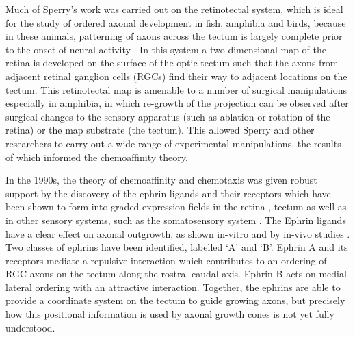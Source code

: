 \documentclass[11pt, a4paper]{article}
\begin{document}
Much of Sperry's work was carried out on the retinotectal system, which is ideal for the study of ordered axonal development in fish, amphibia and birds, because in these animals, patterning of axons across the tectum is largely complete prior to the onset of neural activity \citep{oleary_molecular_1999}.
In this system a two-dimensional map of  the retina is developed on the surface of the optic tectum such that the axons from adjacent retinal ganglion cells (RGCs) find their way to adjacent locations on the tectum. 
This retinotectal map is amenable to a number of surgical manipulations especially in amphibia, in which re-growth of the projection can be observed after surgical changes to the sensory apparatus (such as ablation or rotation of the retina) or the map substrate (the tectum).
This allowed Sperry and other researchers to carry out a wide range of experimental manipulations, the results of which informed the chemoaffinity theory. 

In the 1990s, the theory of chemoaffinity and chemotaxis was given robust support by the discovery of the ephrin ligands and their receptors \citep{cheng_complementary_1995,drescher_vitro_1995} which have been shown to form into graded expression fields in the retina \citep{braisted_graded_1997}, tectum \citep{braisted_graded_1997,feldheim_genetic_2000} as well as in other sensory systems, such as the somatosensory system \citep{vanderhaeghen_mapping_2000}. %
%
The Ephrin ligands have a clear effect on axonal outgrowth, as shown in-vitro \citep{cheng_complementary_1995,drescher_vitro_1995,hansen_retinal_2004} and by in-vivo studies \citep{frisen_ephrin-a5_1998,rodger_transient_2000,mann_topographic_2002,hindges_ephb_2002}.
Two classes of ephrins have been identified, labelled `A' and `B'.
Ephrin A and its receptors mediate a repulsive interaction which contributes to an ordering of RGC axons on the tectum along the rostral-caudal axis. Ephrin B acts on medial-lateral ordering with an attractive interaction. 
Together, the ephrins are able to provide a coordinate system on the tectum to guide growing axons, but precisely how this positional information is used by axonal growth cones is not yet fully understood.
\end{document}
